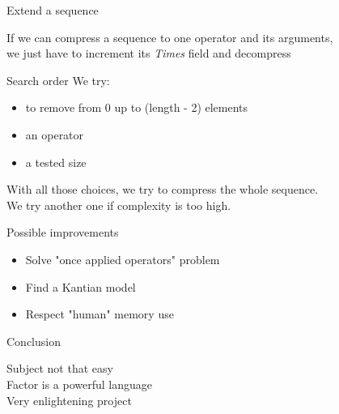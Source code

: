 \documentclass{beamer}
\begin{document}
\begin{frame}{Extend a sequence}
  \begin{center}
    If we can compress a sequence to one operator and its arguments,\\
    we just have to increment its \textit{Times} field and decompress
  \end{center}
\end{frame}

\begin{frame}{Search order}
  We try:
  \begin{itemize}
    \item{to remove from 0 up to (length - 2) elements}
    \item{an operator}
    \item{a tested size}
  \end{itemize}
  With all those choices, we try to compress the whole sequence.\\
  We try another one if complexity is too high.
\end{frame}

\begin{frame}{Possible improvements}
  \begin{center}
    \begin{itemize}
    \item{Solve "once applied operators" problem}
    \item{Find a Kantian model}
    \item{Respect "human" memory use}
  \end{itemize}
   
  \end{center}
\end{frame}

\begin{frame}{Conclusion}
  \begin{center}
  Subject not that easy\\
  Factor is a powerful language\\
  Very enlightening project
  \end{center}
\end{frame}
 
\end{document}
